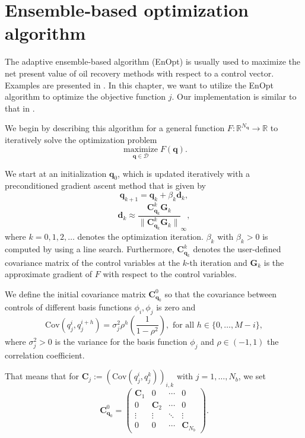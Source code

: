 \chapter{ Ensemble‑based optimization algorithm}

The adaptive ensemble-based algorithm (EnOpt) is usually used to maximize the net present value of oil recovery methods with respect to a control vector. Examples are presented in \cite{Keil2022-dj, OGUNTOLA2021109165, Zhang2023-sg}. In this chapter, we want to utilize the EnOpt algorithm to optimize the objective function $j$. Our implementation is similar to that in \cite{Keil2022-dj}.

We begin by describing this algorithm for a general function $F:\mathbb{R}^{N_\mathbf{q}}\to \mathbb{R}$ to iteratively solve the optimization problem
\begin{displaymath}
\operatorname*{maximize}_{\mathbf{q}\in\mathcal{D}}F(\mathbf{q}).
\end{displaymath}

We start at an initialization $\mathbf{q}_0$,  which is updated iteratively with a preconditioned gradient ascent method that is given by
\begin{displaymath}
\mathbf{q}_{k+1} = \mathbf{q}_k+\beta_k\mathbf{d}_k,
\end{displaymath}
\begin{displaymath}
\mathbf{d}_k\approx\frac{\mathbf{C}_{\mathbf{q}_k}^k\mathbf{G}_k}{\|\mathbf{C}_{\mathbf{q}_k}^k\mathbf{G}_k\|}_\infty,
\end{displaymath}
where $k=0,1,2,\dotsc$ denotes the optimization iteration. $\beta_k$ with $\beta_k>0$ is computed by using a line search. Furthermore, $\mathbf{C}_{\mathbf{q}_k}^k$ denotes the user-defined covariance matrix of the control variables at the $k$-th iteration and $\mathbf{G}_k$ is the approximate gradient of $F$ with respect to the control variables.

We define the initial covariance matrix $\mathbf{C}_{\mathbf{q}_0}^0$ so that the covariance between controls of different basis functions $\phi_i,\phi_j$ is zero and
\begin{displaymath}
\mathrm{Cov}(q_j^i,q_j^{i+h})=\sigma_j^2\rho^h\left(\frac{1}{1-\rho^2}\right),\text{ for all }h\in\{0,\dotsc,M-i\},
\end{displaymath}
where $\sigma_j^2>0$ is the variance for the basis function $\phi_j$ and $\rho\in(-1,1)$ the correlation coefficient.

That means that for $\mathbf{C}_j:=\left(\mathrm{Cov}(q_j^i,q_j^{k})\right)_{i,k}$ with $j=1,\dotsc,N_b$, we set
\begin{equation}
\label{initCov}
\mathbf{C}_{\mathbf{q}_0}^0 =
\begin{pmatrix}
  \mathbf{C}_1 & 0 & \cdots & 0 \\
  0 & \mathbf{C}_2 & \cdots & 0 \\
  \vdots  & \vdots  & \ddots & \vdots  \\
  0 & 0 & \cdots & \mathbf{C}_{N_b} 
 \end{pmatrix}.
\end{equation}


